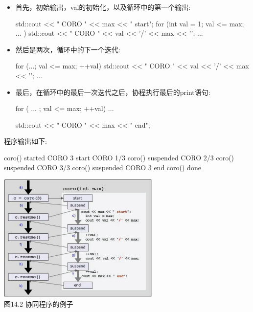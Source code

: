 \begin{itemize}
\item 
首先，初始输出，val的初始化，以及循环中的第一个输出:

\begin{cpp}
std::cout << "                 CORO " << max << " start\n";
for (int val = 1; val <= max; ... ) {
	std::cout << "               CORO " << val << '/' << max << '\n';
	...
}
\end{cpp}

\item 
然后是两次，循环中的下一个迭代:

\begin{cpp}
	for (...; val <= max; ++val) {
		std::cout << "               CORO " << val << '/' << max << '\n';
		...
	}
\end{cpp}

\item 
最后，在循环中的最后一次迭代之后，协程执行最后的print语句:

\begin{cpp}
for ( ... ; val <= max; ++val) {
	...
}

std::cout << " CORO " << max << " end\n";
\end{cpp}
\end{itemize}

程序输出如下:

\begin{shell}
coro() started
         CORO 3 start
         CORO 1/3
coro() suspended
         CORO 2/3
coro() suspended
         CORO 3/3
coro() suspended
         CORO 3 end
coro() done
\end{shell}


\begin{center}
\includegraphics[width=0.6\textwidth]{content/chapter14/images/2.png}\\
图14.2 协同程序的例子
\end{center}

